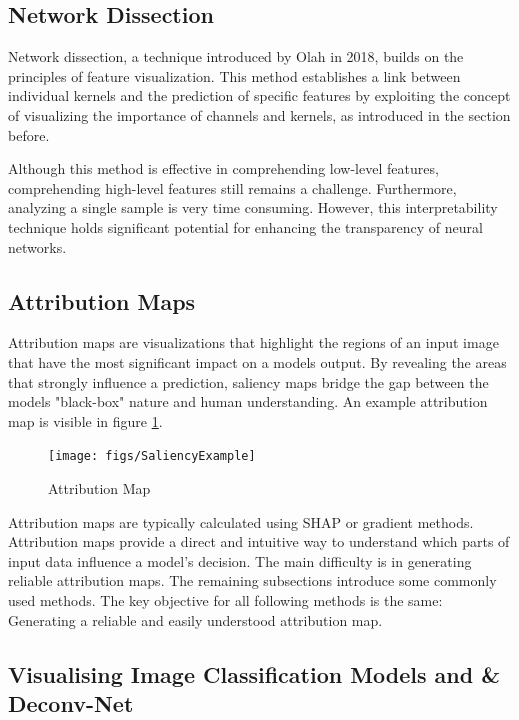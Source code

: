 \subsection{Network Dissection}

Network dissection, a technique introduced by Olah in 2018\cite{olah2018the}, builds on the principles of feature visualization. This method establishes a link between individual kernels and the prediction of specific features by exploiting the concept of visualizing the importance of channels and kernels, as introduced in the section before.

Although this method is effective in comprehending low-level features, comprehending high-level features still remains a challenge. Furthermore, analyzing a single sample is very time consuming. However, this interpretability technique holds significant potential for enhancing the transparency of neural networks.


\subsection{Attribution Maps}
\label{sec:saliency}
Attribution maps are visualizations that highlight the regions of an input image that have the most significant impact on a models output. By revealing the areas that strongly influence a prediction, saliency maps bridge the gap between the models "black-box" nature and human understanding. An example attribution map is visible in figure \ref{fig:saliency}.

\begin{figure}[H]
	\centering
	\texttt{[image: figs/SaliencyExample]}
	\caption[Attribution Map \cite{captum}]{Attribution Map}
	\label{fig:saliency}
\end{figure}

Attribution maps are typically calculated using SHAP\cite{lundberg2017unified} or gradient methods. Attribution maps provide a direct and intuitive way to understand which parts of input data influence a model's decision. The main difficulty is in generating reliable attribution maps. The remaining subsections introduce some commonly used methods. The key objective for all following methods is the same: Generating a reliable and easily understood attribution map.

\subsection{Visualising Image Classification Models and \& Deconv-Net}


